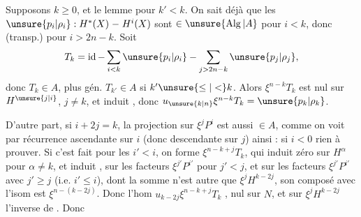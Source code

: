 
Supposons $k\geq0$, et le lemme  pour $k'<k$. On sait déjà que les $\unsure{p_i|\rho_i}:H^*(X)\mathrel{-}H^i(X)$ sont $\in\unsure{\operatorname{Alg}|A}$ pour $i<k$, donc (transp.) pour $i>2n-k$. Soit
\[
T_k=\operatorname{id}-\sum_{i<k}\unsure{p_i|\rho_i}-\sum_{j>2n-k}\unsure{p_j|\rho_j},
\]
donc $T_k\in A$, plus gén. $T_{k'}\in A$ si $k'\unsure{\leq|<}k$. Alors $\xi^{n-k}T_k$ est nul sur $H^{\unsure{j|i}}$, $j\neq k$, et induit
, donc $u_{\unsure{k|n}}\xi^{n-k}T_k=\unsure{p_k|\rho_k}$.

D'autre part, si $i+2j=k$,  la projection sur $\xi^jP^i$ est aussi $\in A$, comme on voit  par récurrence ascendante sur $i$ (donc descendante sur $j$) ainsi : si $i<0$ rien à prouver. Si c'est fait pour les $i'<i$, on forme $\xi^{n-k+j}T_k$, \deleted{$\unsure{\xi}$} qui induit zéro sur $H^\alpha$ pour $\alpha\neq k$, et induit
,   sur les facteurs $\xi^{j'}P^{i'}$ pour $j'<j$,  et sur les facteurs $\xi^{j'}P^{i'}$ avec $j'\geq j$ (i.e. $i'\leq i$),  dont la somme n'est autre que $\xi^jH^{k-2j}$, son composé avec l'isom
est $\xi^{n-(k-2j)}$. Donc l'hom $u_{k-2j}\xi^{n-k+j}T_k$ , nul sur $N$, et sur $\xi^jH^{k-2j}$ l'inverse de
. Donc

